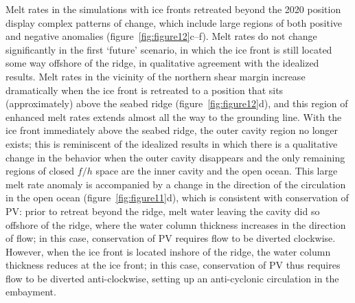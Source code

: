 \documentclass[draft]{agujournal2019}
\begin{document}
Melt rates in the simulations with ice fronts retreated beyond the 2020 position display complex patterns of change, which include large regions of both positive and negative anomalies (figure~\ref{fig:figure12}c--f). Melt rates do not change significantly in the first `future' scenario, in which the ice front is still located some way offshore of the ridge, in qualitative agreement with the idealized results. Melt rates in the vicinity of the northern shear margin increase dramatically when the ice front is retreated to a position that sits (approximately) above the seabed ridge (figure~\ref{fig:figure12}d), and this region of enhanced melt rates extends almost all the way to the grounding line. With the ice front immediately above the seabed ridge, the outer cavity region no longer exists; this is reminiscent of the idealized results in which there is a qualitative change in the behavior when the outer cavity disappears and the only remaining regions of closed $f/h$ space are the inner cavity and the open ocean.  %
This large melt rate anomaly is accompanied by a change in the direction of the circulation in the open ocean (figure~\ref{fig:figure11}d), which is consistent with conservation of PV: prior to retreat beyond the ridge, melt water leaving the cavity did so offshore of the ridge, where the water column thickness increases in the direction of flow; in this case, conservation of PV requires flow to be diverted clockwise. However, when the ice front is located inshore of the ridge, the water column thickness reduces at the ice front; in this case, conservation of PV thus requires flow to be diverted anti-clockwise, setting up an anti-cyclonic circulation in the embayment.
\end{document}
